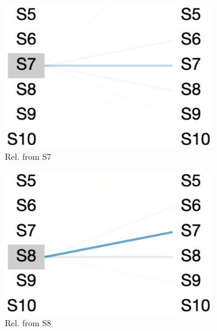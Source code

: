 \begin{figure}
     \centering
     \begin{subfigure}[b]{0.15\textwidth}
         \centering
         \includegraphics[width=\textwidth]{sec9-fig1.png}
         \caption{Rel. from S7}
         \label{fig:stmt-7}
     \end{subfigure}
     \hfill
     \begin{subfigure}[b]{0.15\textwidth}
         \centering
         \includegraphics[width=\textwidth]{sec9-fig2.png}
         \caption{Rel. from S8}
         \label{fig:stmt-8}
     \end{subfigure}
     \hfill
     \begin{subfigure}[b]{0.15\textwidth}
         \centering

\end{subfigure}
\end{figure}
